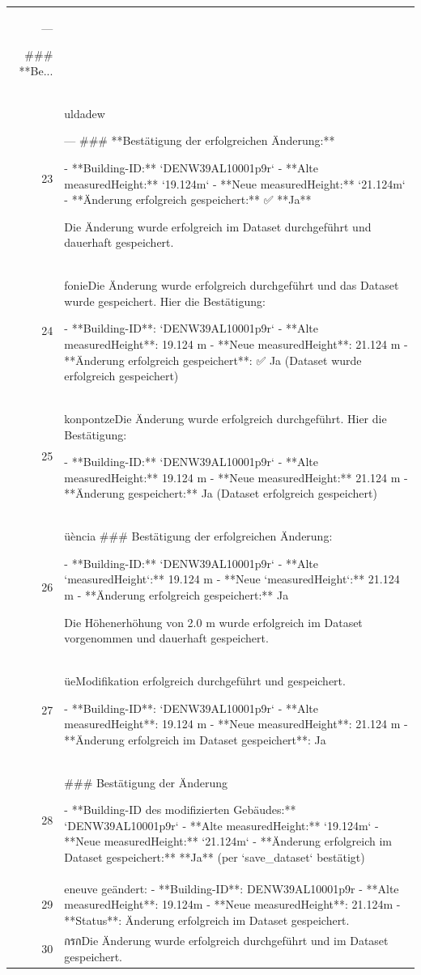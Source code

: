 \documentclass[a4paper,11pt]{article}
\begin{document}
\begin{table}[ht]
\begin{tabular}{r p{12cm}}
---

\#\#\# **Be... \\
23 & uldadew

---
\#\#\# **Bestätigung der erfolgreichen Änderung:**

- **Building-ID:** `DENW39AL10001p9r`
- **Alte measuredHeight:** `19.124m`
- **Neue measuredHeight:** `21.124m`
- **Änderung erfolgreich gespeichert:** ✅ **Ja**

Die Änderung wurde erfolgreich im Dataset durchgeführt und dauerhaft gespeichert. \\
24 & fonieDie Änderung wurde erfolgreich durchgeführt und das Dataset wurde gespeichert. Hier die Bestätigung:

- **Building-ID**: `DENW39AL10001p9r`
- **Alte measuredHeight**: 19.124 m
- **Neue measuredHeight**: 21.124 m
- **Änderung erfolgreich gespeichert**: ✅ Ja (Dataset wurde erfolgreich gespeichert) \\
25 &  konpontzeDie Änderung wurde erfolgreich durchgeführt. Hier die Bestätigung:

- **Building-ID:** `DENW39AL10001p9r`
- **Alte measuredHeight:** 19.124 m
- **Neue measuredHeight:** 21.124 m
- **Änderung gespeichert:** Ja (Dataset erfolgreich gespeichert) \\
26 & üència
\#\#\# Bestätigung der erfolgreichen Änderung:

- **Building-ID:** `DENW39AL10001p9r`
- **Alte `measuredHeight`:** 19.124 m
- **Neue `measuredHeight`:** 21.124 m
- **Änderung erfolgreich gespeichert:** Ja

Die Höhenerhöhung von 2.0 m wurde erfolgreich im Dataset vorgenommen und dauerhaft gespeichert. \\
27 & üeModifikation erfolgreich durchgeführt und gespeichert.

- **Building-ID**: `DENW39AL10001p9r`
- **Alte measuredHeight**: 19.124 m
- **Neue measuredHeight**: 21.124 m
- **Änderung erfolgreich im Dataset gespeichert**: Ja \\
28 & \#\#\# Bestätigung der Änderung

- **Building-ID des modifizierten Gebäudes:** `DENW39AL10001p9r`
- **Alte measuredHeight:** `19.124m`
- **Neue measuredHeight:** `21.124m`
- **Änderung erfolgreich im Dataset gespeichert:** **Ja** (per `save\_dataset` bestätigt) \\
29 & eneuve geändert:
- **Building-ID**: DENW39AL10001p9r
- **Alte measuredHeight**: 19.124m
- **Neue measuredHeight**: 21.124m
- **Status**: Änderung erfolgreich im Dataset gespeichert. \\
30 &  กรกDie Änderung wurde erfolgreich durchgeführt und im Dataset gespeichert.


\end{tabular}
\end{table}
\end{document}
